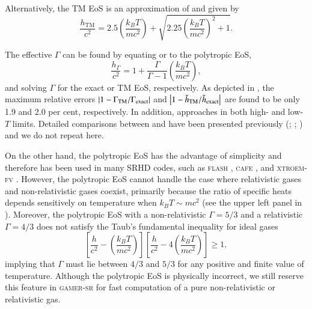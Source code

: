 \documentclass[twocolumn]{aastex63}
\begin{document}
Alternatively, the TM EoS is an approximation of  and given by
\begin{equation}
\frac{h_{\text{TM}}}{c^2}=2.5\left(\frac{k_B T}{mc^2}\right)+\sqrt{2.25{\left(\frac{k_B T}{mc^2}\right)}^{2}+1}.
\label{TM EOS}
\end{equation}

The effective $\Gamma$ can be found by equating  or  to the polytropic EoS,
\begin{equation}
    \frac{h_{\Gamma}}{c^2}=
    1+\frac{\Gamma}{\Gamma-1}\left(\frac{k_{B}T}{mc^2}\right),
\end{equation}
and solving $\Gamma$ for the exact or TM EoS, respectively. As depicted in , the maximum relative errors $\abs{1-\Gamma_{\text{TM}}/\Gamma_{\text{exact}}}$ and $\abs{1-\tilde{h}_{\text{TM}}/\tilde{h}_{\text{exact}}}$ are found to be only 1.9 and 2.0 per cent, respectively.  In addition,  approaches  in both high- and low-$T$ limits. Detailed comparisons between  and  have been presented previously (\citealt{Compare_TM_EOS}; \citealt{RC_EOS}; \citealt{NR_Limit}) and we do not repeat here.

On the other hand, the polytropic EoS has the advantage of simplicity and therefore has been used in many SRHD codes, such as \textsc{flash} \citep{FLASH}, \textsc{cafe} \citep{CAFE}, and \textsc{xtroem-fv} \citep{XTROEM}. However, the polytropic EoS cannot handle the case where relativistic gases  and non-relativistic gases coexist, primarily because the ratio of specific heats depends sensitively on temperature when $k_{B}T \sim mc^2$ (see the upper left panel in ). Moreover, the polytropic EoS with a non-relativistic $\Gamma=5/3$ and a relativistic $\Gamma=4/3$ does not satisfy the Taub's fundamental inequality for ideal gases \citep{Taub}
\begin{equation}
    \left[\frac{h}{c^2}-\left(\frac{k_B T}{mc^2}\right)\right]
    \left[\frac{h}{c^2}-4\left(\frac{k_B T}{mc^2}\right)\right]
    \geq 1,
\end{equation}
implying that $\Gamma$ must lie between $4/3$ and $5/3$ for any positive and finite value of temperature. Although the polytropic EoS is physically incorrect, we still reserve this feature in \textsc{gamer-sr} for fast computation of a pure non-relativistic or relativistic gas.
\end{document}
